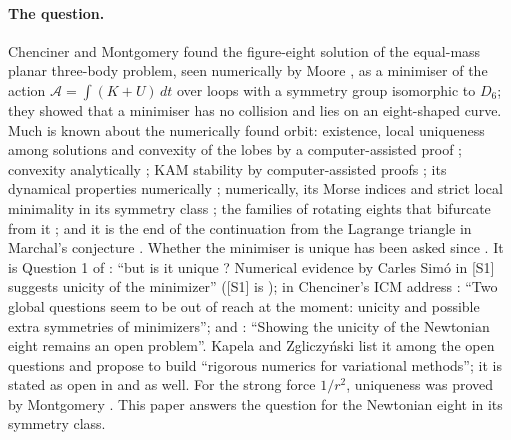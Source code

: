 \documentclass[11pt]{article}
\theoremstyle{definition}
\begin{document}
\paragraph{The question.} Chenciner and Montgomery \cite{CM} found the figure-eight solution of the equal-mass planar
three-body problem, seen numerically by Moore \cite{Moore}, as a minimiser of the action
$\mathcal A=\int (K+U)\,dt$ over loops with a symmetry group isomorphic to $D_6$; they showed that a minimiser has no
collision and lies on an eight-shaped curve. Much is known about the numerically found orbit: existence, local uniqueness among
solutions and convexity of the lobes by a computer-assisted proof \cite{KZ}; convexity analytically \cite{FM}; KAM
stability by computer-assisted proofs \cite{KS,KS17}; its dynamical properties numerically \cite{Simo}; numerically,
its Morse indices and strict local minimality in its symmetry class \cite{HuSun,FFO18,Fenucci}; the families of
rotating eights that bifurcate from it \cite{CFM}; and it is the end of the continuation from the Lagrange triangle
in Marchal's conjecture \cite{CGHLM}. Whether the minimiser is unique has been asked since \cite{CM}. It is Question 1 of \cite{ChTaiyuan}:
``but is it unique ? Numerical evidence by Carles Sim\'o in [S1] suggests unicity of the minimizer'' ([S1] is \cite{Simo}); in Chenciner's
ICM address \cite[p.~291]{ChICM}: ``Two global questions seem to be out of reach at the moment: unicity and possible
extra symmetries of minimizers''; and \cite[\S6]{FM}: ``Showing the unicity of the Newtonian eight remains an open
problem''. Kapela and Zgliczy\'nski \cite[\S8]{KZ} list it among the open questions and propose to build ``rigorous
numerics for variational methods''; it is stated as open in \cite[Remark~4.16]{BFT} and \cite{CGHLM} as well. For the strong
force $1/r^2$, uniqueness was proved by Montgomery \cite{Mpants}. This paper answers the question for the Newtonian
eight in its symmetry class.
\end{document}
